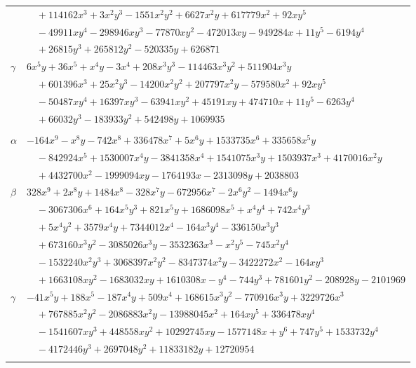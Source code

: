 \documentclass[11pt]{article}
\begin{document}
\begin{longtable}{@{}ll@{}}
 & $\quad +114162x^{3}+3x^{2}y^{3}-1551x^{2}y^{2}+6627x^{2}y+617779x^{2}+92xy^{5}$\\
 & $\quad -49911xy^{4}-298946xy^{3}-77870xy^{2}-472013xy-949284x+11y^{5}-6194y^{4}$\\
 & $\quad +26815y^{3}+265812y^{2}-520335y+626871$\\
$\gamma$ & $6x^{5}y+36x^{5}+x^{4}y-3x^{4}+208x^{3}y^{3}-114463x^{3}y^{2}+511904x^{3}y$\\
 & $\quad +601396x^{3}+25x^{2}y^{3}-14200x^{2}y^{2}+207797x^{2}y-579580x^{2}+92xy^{5}$\\
 & $\quad -50487xy^{4}+16397xy^{3}-63941xy^{2}+45191xy+474710x+11y^{5}-6263y^{4}$\\
 & $\quad +66032y^{3}-183933y^{2}+542498y+1069935$\\
\addlinespace[3pt]
\multicolumn{2}{@{}l}{$\{i,j\}=\{32,169\}$, $k_{ij}=2^{8}\cdot 3^{3}\cdot 7^{2}\cdot 37$}\\
$\alpha$ & $-164x^{9}-x^{8}y-742x^{8}+336478x^{7}+5x^{6}y+1533735x^{6}+335658x^{5}y$\\
 & $\quad -842924x^{5}+1530007x^{4}y-3841358x^{4}+1541075x^{3}y+1503937x^{3}+4170016x^{2}y$\\
 & $\quad +4432700x^{2}-1999094xy-1764193x-2313098y+2038803$\\
$\beta$ & $328x^{9}+2x^{8}y+1484x^{8}-328x^{7}y-672956x^{7}-2x^{6}y^{2}-1494x^{6}y$\\
 & $\quad -3067306x^{6}+164x^{5}y^{3}+821x^{5}y+1686098x^{5}+x^{4}y^{4}+742x^{4}y^{3}$\\
 & $\quad +5x^{4}y^{2}+3579x^{4}y+7344012x^{4}-164x^{3}y^{4}-336150x^{3}y^{3}$\\
 & $\quad +673160x^{3}y^{2}-3085026x^{3}y-3532363x^{3}-x^{2}y^{5}-745x^{2}y^{4}$\\
 & $\quad -1532240x^{2}y^{3}+3068397x^{2}y^{2}-8347374x^{2}y-3422272x^{2}-164xy^{3}$\\
 & $\quad +1663108xy^{2}-1683032xy+1610308x-y^{4}-744y^{3}+781601y^{2}-208928y-2101969$\\
$\gamma$ & $-41x^{5}y+188x^{5}-187x^{4}y+509x^{4}+168615x^{3}y^{2}-770916x^{3}y+3229726x^{3}$\\
 & $\quad +767885x^{2}y^{2}-2086883x^{2}y-13988045x^{2}+164xy^{5}+336478xy^{4}$\\
 & $\quad -1541607xy^{3}+448558xy^{2}+10292745xy-1577148x+y^{6}+747y^{5}+1533732y^{4}$\\
 & $\quad -4172446y^{3}+2697048y^{2}+11833182y+12720954$\\
\addlinespace[3pt]
\multicolumn{2}{@{}l}{$\{i,j\}=\{32,170\}$, $k_{ij}=2^{8}\cdot 3^{2}\cdot 13^{2}$}\\

\end{longtable}
\end{document}
